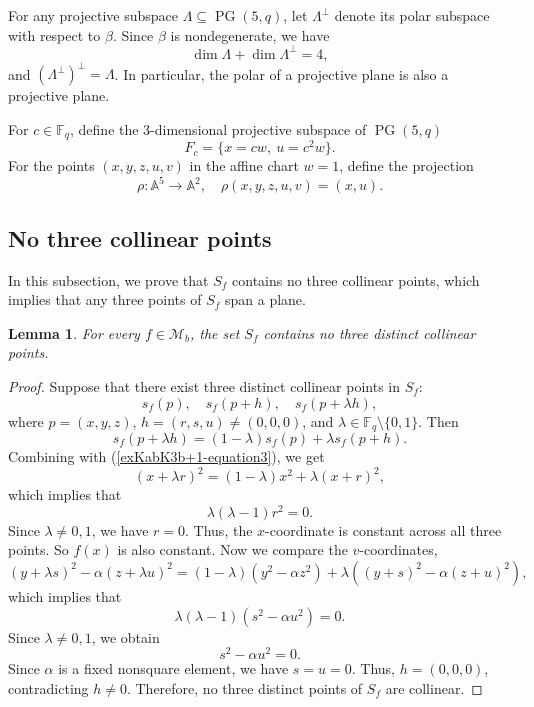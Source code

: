 \documentclass[11pt,a4paper]{article}
\newtheorem{lemma}[theorem]{Lemma}
\theoremstyle{definition}
\theoremstyle{remark}
\newcommand{\PG}{\operatorname{PG}}
\begin{document}
For any projective subspace $\Lambda\subseteq \PG(5,q)$, let $\Lambda^\perp$ denote its polar subspace with respect to $\beta$. Since $\beta$ is nondegenerate, we have
\[
\dim \Lambda + \dim \Lambda^\perp = 4,
\]
and $(\Lambda^\perp)^\perp = \Lambda$. In particular, the polar of a projective plane is also a projective plane.

For $c \in \mathbb{F}_q$, define the 3-dimensional projective subspace of $\PG(5,q)$
\begin{equation}\label{exKabK3b+1-equation4}
F_c = \{ x = c w,\ u = c^2 w \}.
\end{equation}
For the points $(x, y, z, u, v)$ in the affine chart $w=1$, define the projection
\[
\rho : \mathbb{A}^5 \to \mathbb{A}^2, \quad \rho(x, y, z, u, v) = (x, u).
\]


\subsection{No three collinear points}
\label{sec:no-three-collinear}

In this subsection, we prove that $S_f$ contains no three collinear points, which implies that any three points of $S_f$ span a plane.

\begin{lemma} \label{lem:no-three-collinear}
For every $f \in \mathcal{M}_b$, the set $S_f$ contains no three distinct collinear points.
\end{lemma}

\begin{proof}
Suppose that there exist three distinct collinear points in $S_f$:
\[
s_f(p), \quad s_f(p + h), \quad s_f(p + \lambda h),
\]
where $p = (x, y, z)$, $h = (r, s, u) \neq (0, 0, 0)$, and $\lambda \in \mathbb{F}_q \setminus \{0, 1\}$. Then
\[
s_f(p + \lambda h) = (1 - \lambda) s_f(p) + \lambda s_f(p + h).
\]
Combining with (\ref{exKabK3b+1-equation3}), we get
\[
(x + \lambda r)^2 = (1 - \lambda) x^2 + \lambda (x + r)^2,
\]
which implies that
\[
\lambda(\lambda - 1) r^2 = 0.
\]
Since $\lambda \neq 0, 1$, we have $r = 0$.
Thus, the $x$-coordinate is constant across all three points. So $f(x)$ is also constant. Now we compare the $v$-coordinates, 
\[
(y + \lambda s)^2 - \alpha (z + \lambda u)^2 = (1 - \lambda)(y^2 - \alpha z^2) + \lambda ((y + s)^2 - \alpha (z + u)^2),
\]
which implies that
\[
\lambda(\lambda - 1) (s^2 - \alpha u^2) = 0.
\]
Since $\lambda \neq 0, 1$, we obtain
\[
s^2 - \alpha u^2 = 0.
\]
Since $\alpha$ is a fixed nonsquare element, we have $s = u = 0$. Thus, $h = (0,0,0)$, contradicting $h \neq 0$.
Therefore, no three distinct points of $S_f$ are collinear.
\end{proof}
\end{document}
